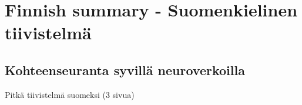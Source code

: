 \section{Finnish summary - Suomenkielinen tiivistelmä}

\clearpage

\setcounter{subsection}{-1}
\let\oldsubsection=\thesubsection
\renewcommand{\thesubsection}{\thesection}

\subsection{Kohteenseuranta syvillä neuroverkoilla}

Pitkä tiivistelmä suomeksi (3 sivua)

\renewcommand{\thesubsection}{\oldsubsection}
